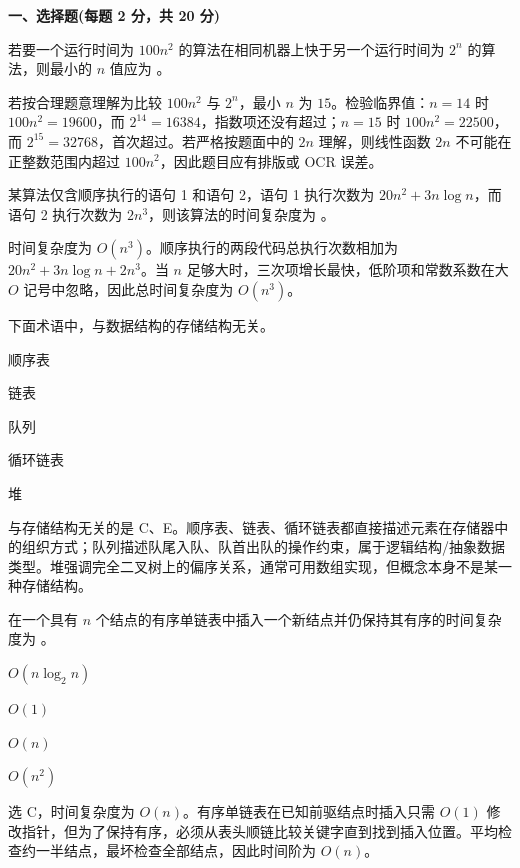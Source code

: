 

\textbf{一、选择题(每题 2 分，共 20 分)}

\begin{question}
若要一个运行时间为 $100n^2$ 的算法在相同机器上快于另一个运行时间为 $2^n$ 的算法，则最小的 $n$ 值应为 \blank。
\begin{solution}
若按合理题意理解为比较 $100n^2$ 与 $2^n$，最小 $n$ 为 $15$。检验临界值：$n=14$ 时 $100n^2=19600$，而 $2^{14}=16384$，指数项还没有超过；$n=15$ 时 $100n^2=22500$，而 $2^{15}=32768$，首次超过。若严格按题面中的 $2n$ 理解，则线性函数 $2n$ 不可能在正整数范围内超过 $100n^2$，因此题目应有排版或 OCR 误差。
\end{solution}
\end{question}

\begin{question}
某算法仅含顺序执行的语句 1 和语句 2，语句 1 执行次数为 $20n^2+3n\log n$，而语句 2 执行次数为 $2n^3$，则该算法的时间复杂度为 \blank。
\begin{solution}
时间复杂度为 $O(n^3)$。顺序执行的两段代码总执行次数相加为 $20n^2+3n\log n+2n^3$。当 $n$ 足够大时，三次项增长最快，低阶项和常数系数在大 $O$ 记号中忽略，因此总时间复杂度为 $O(n^3)$。
\end{solution}
\end{question}

\begin{question}
下面术语中，\blank 与数据结构的存储结构无关。
\begin{choiceoptions}[5]
  \item 顺序表
  \item 链表
  \item 队列
  \item 循环链表
  \item 堆
\end{choiceoptions}
\begin{solution}
与存储结构无关的是 C、E。顺序表、链表、循环链表都直接描述元素在存储器中的组织方式；队列描述队尾入队、队首出队的操作约束，属于逻辑结构/抽象数据类型。堆强调完全二叉树上的偏序关系，通常可用数组实现，但概念本身不是某一种存储结构。
\end{solution}
\end{question}

\begin{question}
在一个具有 $n$ 个结点的有序单链表中插入一个新结点并仍保持其有序的时间复杂度为 \blank。
\begin{choiceoptions}[2]
  \item $O(n\log_2 n)$
  \item $O(1)$
  \item $O(n)$
  \item $O(n^2)$
\end{choiceoptions}
\begin{solution}
选 C，时间复杂度为 $O(n)$。有序单链表在已知前驱结点时插入只需 $O(1)$ 修改指针，但为了保持有序，必须从表头顺链比较关键字直到找到插入位置。平均检查约一半结点，最坏检查全部结点，因此时间阶为 $O(n)$。
\end{solution}
\end{question}

